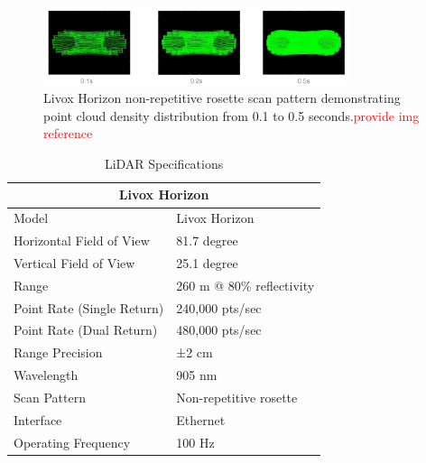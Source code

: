 \documentclass{erauthesis}
\begin{document}


 
\begin{figure}[htbp]
\centering
\includegraphics[width=0.8\textwidth]{Images/Livox_1.png}
\caption{Livox Horizon non-repetitive rosette scan pattern demonstrating point cloud density distribution from 0.1 to 0.5 seconds.\textcolor{red}{provide img reference}}
\label{fig:livox_scan_pattern}
\end{figure}

\begin{table}[htpb]
\centering
\caption{LiDAR Specifications}
\begin{tabular}{ll}
\hline
\multicolumn{2}{c}{Livox Horizon}\\
\hline
\hline
Model & Livox Horizon \\
Horizontal Field of View & 81.7 degree \\
Vertical Field of View & 25.1 degree \\
Range & 260 m @ 80\% reflectivity \\
Point Rate (Single Return) & 240,000 pts/sec \\
Point Rate (Dual Return) & 480,000 pts/sec \\
Range Precision & ±2 cm \\
Wavelength & 905 nm \\
Scan Pattern & Non-repetitive rosette \\
Interface & Ethernet \\
Operating Frequency & 100 Hz \\
\hline
\end{tabular}
\label{table:livox_horizon_specs}
\end{table}
\end{document}
